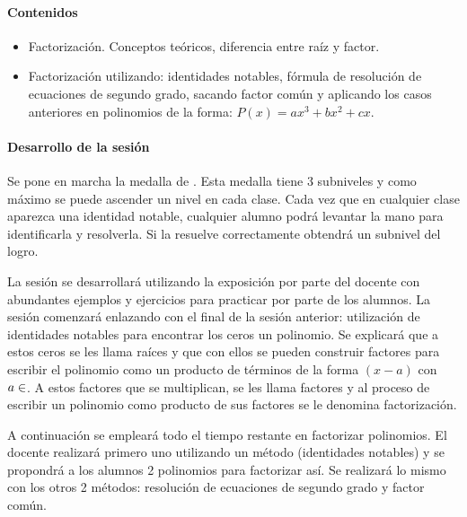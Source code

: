 \paragraph{Contenidos}
\begin{itemize}
	\item Factorización. Conceptos teóricos, diferencia entre raíz y factor.
	\item Factorización utilizando: identidades notables, fórmula de resolución de ecuaciones de segundo grado, sacando factor común y aplicando los casos anteriores en polinomios de la forma: $P(x) = ax^3+bx^2+cx$.
\end{itemize}

\paragraph{Desarrollo de la sesión}

Se pone en marcha la medalla de .
%
Esta medalla tiene 3 subniveles y como máximo se puede ascender un nivel en cada clase.
%
Cada vez que en cualquier clase aparezca una identidad notable, cualquier alumno podrá levantar la mano para identificarla y resolverla. 
%
Si la resuelve correctamente obtendrá un subnivel del logro.

La sesión se desarrollará utilizando la exposición por parte del docente con abundantes ejemplos y ejercicios para practicar por parte de los alumnos.
%
La sesión comenzará enlazando con el final de la sesión anterior: utilización de identidades notables para encontrar los ceros un polinomio.
%
Se explicará que a estos ceros se les llama raíces y que con ellos se pueden construir factores para escribir el polinomio como un producto de términos de la forma $(x-a)$ con $a\in\real$.
%
A estos factores que se multiplican, se les llama factores y al proceso de escribir un polinomio como producto de sus factores se le denomina factorización.

A continuación se empleará todo el tiempo restante en factorizar polinomios.
%
El docente realizará primero uno utilizando un método (identidades notables) y se propondrá a los alumnos 2 polinomios para factorizar así.
%
Se realizará lo mismo con los otros 2 métodos: resolución de ecuaciones de segundo grado y factor común.





